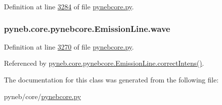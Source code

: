 Definition at line \hyperlink{pynebcore_8py_source_l03284}{3284} of file \hyperlink{pynebcore_8py_source}{pynebcore.\+py}.

\hypertarget{classpyneb_1_1core_1_1pynebcore_1_1_emission_line_a32755b006f794c0759c7b7da330b2dc1}{}
\subsubsection[{wave}]{\setlength{\rightskip}{0pt plus 5cm}pyneb.\+core.\+pynebcore.\+Emission\+Line.\+wave}\label{classpyneb_1_1core_1_1pynebcore_1_1_emission_line_a32755b006f794c0759c7b7da330b2dc1}


Definition at line \hyperlink{pynebcore_8py_source_l03270}{3270} of file \hyperlink{pynebcore_8py_source}{pynebcore.\+py}.



Referenced by \hyperlink{pynebcore_8py_source_l03325}{pyneb.\+core.\+pynebcore.\+Emission\+Line.\+correct\+Intens()}.



The documentation for this class was generated from the following file\+:\begin{DoxyCompactItemize}
\item 
pyneb/core/\hyperlink{pynebcore_8py}{pynebcore.\+py}\end{DoxyCompactItemize}
